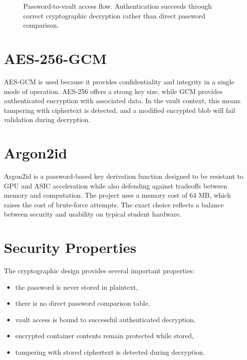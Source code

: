\documentclass[12pt,a4paper]{report}
\begin{document}
\begin{figure}[H]
\centering
{}
\caption{Password-to-vault access flow. Authentication succeeds through correct cryptographic decryption rather than direct password comparison.}
\label{fig:keyflow}
\end{figure}

\section{AES-256-GCM}
AES-GCM is used because it provides confidentiality and integrity in a single mode of operation. AES-256 offers a strong key size, while GCM provides authenticated encryption with associated data. In the vault context, this means tampering with ciphertext is detected, and a modified encrypted blob will fail validation during decryption.

\section{Argon2id}
Argon2id is a password-based key derivation function designed to be resistant to GPU and ASIC acceleration while also defending against tradeoffs between memory and computation. The project uses a memory cost of 64 MB, which raises the cost of brute-force attempts. The exact choice reflects a balance between security and usability on typical student hardware.

\section{Security Properties}
The cryptographic design provides several important properties:
\begin{itemize}
  \item the password is never stored in plaintext,
  \item there is no direct password comparison table,
  \item vault access is bound to successful authenticated decryption,
  \item encrypted container contents remain protected while stored,
  \item tampering with stored ciphertext is detected during decryption.
\end{itemize}
\end{document}
